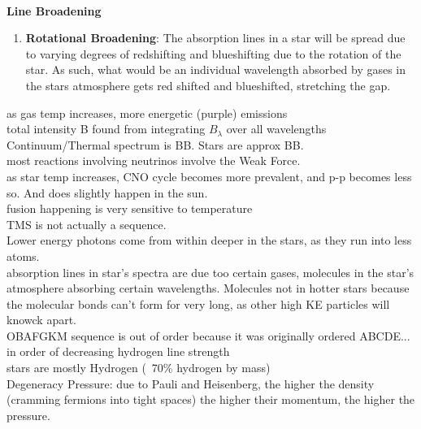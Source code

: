 \documentclass[10pt]{article}
\begin{document}
	\\\textbf{Line Broadening} 
	\begin{enumerate}
		\item \textbf{Rotational Broadening}: The absorption lines in a star will be spread due to varying degrees of redshifting and blueshifting due to the rotation of the star. As such, what would be an individual wavelength absorbed by gases in the stars atmosphere gets red shifted and blueshifted, stretching the gap.
	\end{enumerate}
	as gas temp increases, more energetic (purple) emissions
	\\ total intensity B found from integrating $B_\lambda$ over all wavelengths
	\\ Continuum/Thermal spectrum is BB. Stars are approx BB.
	\\ most reactions involving neutrinos involve the Weak Force.
	\\ as star temp increases, CNO cycle becomes more prevalent, and p-p becomes less so. And does slightly happen in the sun.
	\\ fusion happening is very sensitive to temperature
	\\ TMS is not actually a sequence.
	\\ Lower energy photons come from within deeper in the stars, as they run into less atoms.
	\\ absorption lines in star's spectra are due too certain gases, molecules in the star's atmosphere absorbing certain wavelengths. Molecules not in hotter stars because the molecular bonds can't form for very long, as other high KE particles will knowck apart.
	\\ OBAFGKM sequence is out of order because it was originally ordered ABCDE... in order of decreasing hydrogen line strength
	\\ stars are mostly Hydrogen (~70\% hydrogen by mass)
	\\ Degeneracy Pressure: due to Pauli and Heisenberg, the higher the density (cramming fermions into tight spaces) the higher their momentum, the higher the pressure.
\end{document}
